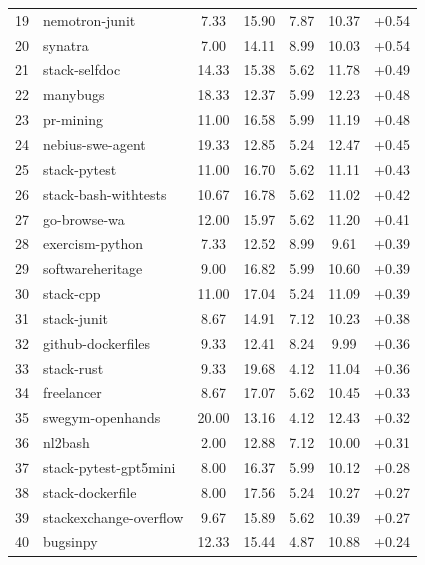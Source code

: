 \documentclass{llmxive}
\begin{document}
\begin{table}[!htbp]
\begin{tabular}{rlccccc}
19 & nemotron-junit                 &  7.33 & 15.90 &  7.87 & 10.37 & +0.54 \\
20 & synatra                        &  7.00 & 14.11 &  8.99 & 10.03 & +0.54 \\
21 & stack-selfdoc                  & 14.33 & 15.38 &  5.62 & 11.78 & +0.49 \\
22 & manybugs                       & 18.33 & 12.37 &  5.99 & 12.23 & +0.48 \\
23 & pr-mining                      & 11.00 & 16.58 &  5.99 & 11.19 & +0.48 \\
24 & nebius-swe-agent               & 19.33 & 12.85 &  5.24 & 12.47 & +0.45 \\
25 & stack-pytest                   & 11.00 & 16.70 &  5.62 & 11.11 & +0.43 \\
26 & stack-bash-withtests           & 10.67 & 16.78 &  5.62 & 11.02 & +0.42 \\
27 & go-browse-wa                   & 12.00 & 15.97 &  5.62 & 11.20 & +0.41 \\
28 & exercism-python                &  7.33 & 12.52 &  8.99 &  9.61 & +0.39 \\
29 & softwareheritage               &  9.00 & 16.82 &  5.99 & 10.60 & +0.39 \\
30 & stack-cpp                      & 11.00 & 17.04 &  5.24 & 11.09 & +0.39 \\
31 & stack-junit                    &  8.67 & 14.91 &  7.12 & 10.23 & +0.38 \\
32 & github-dockerfiles             &  9.33 & 12.41 &  8.24 &  9.99 & +0.36 \\
33 & stack-rust                     &  9.33 & 19.68 &  4.12 & 11.04 & +0.36 \\
34 & freelancer                     &  8.67 & 17.07 &  5.62 & 10.45 & +0.33 \\
35 & swegym-openhands               & 20.00 & 13.16 &  4.12 & 12.43 & +0.32 \\
36 & nl2bash                        &  2.00 & 12.88 &  7.12 & 10.00 & +0.31 \\
37 & stack-pytest-gpt5mini          &  8.00 & 16.37 &  5.99 & 10.12 & +0.28 \\
38 & stack-dockerfile               &  8.00 & 17.56 &  5.24 & 10.27 & +0.27 \\
39 & stackexchange-overflow         &  9.67 & 15.89 &  5.62 & 10.39 & +0.27 \\
40 & bugsinpy                       & 12.33 & 15.44 &  4.87 & 10.88 & +0.24 \\

\end{tabular}
\end{table}
\end{document}
